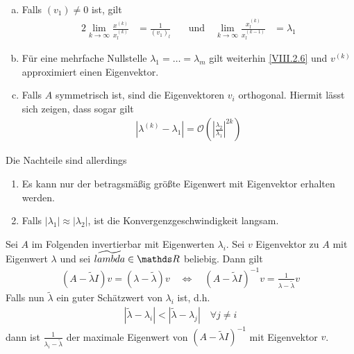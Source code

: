 \begin{Beme}~
  \begin{enumerate}[a)]
  \item Falls $(v_1)\neq 0$ ist, gilt
    \begin{alignat}{2}
      \lim_{k\to\infty} \frac{x^{(k)}}{x_l^{(k)}}
      &= \frac{1}{(v_1)_l}\quad
      &\text{und}\quad\lim_{k\to\infty}\frac{x_l^{(k)}}{x_l^{(k-1)}}
      &=\lambda_1
      \label{VIII.2.6}
    \end{alignat}
  \item Für eine mehrfache Nullstelle $\lambda_1=\ldots=\lambda_m$
    gilt weiterhin \eqref{VIII.2.6} und
    $v^{(k)}$ approximiert einen Eigenvektor.
  \item Falls $A$ symmetrisch ist,
    sind die Eigenvektoren $v_i$ orthogonal.
    Hiermit lässt sich zeigen, dass sogar gilt
    \begin{gather*}
      \left|\lambda^{(k)}-\lambda_1\right|
      = \mathcal{O}\left(\left|
        \frac{\lambda_2}{\lambda_1}
        \right|^{2k}\right)
    \end{gather*}
  \end{enumerate}
Die Nachteile sind allerdings
\begin{enumerate}[1)]
\item Es kann nur der betragsmäßig größte Eigenwert
  mit Eigenvektor erhalten werden.
\item Falls $|\lambda_1|\approx|\lambda_2|$,
  ist die Konvergenzgeschwindigkeit langsam.
\end{enumerate}
\end{Beme}


Sei $A$ im Folgenden invertierbar mit Eigenwerten $\lambda_i$.
Sei $v$ Eigenvektor zu $A$ mit Eigenwert $\lambda$ und
sei $\widetilde{lambda}\in\R$ beliebig. Dann gilt
\begin{gather*}
  (A-\widetilde{\lambda}I) v= (\lambda-\widetilde{\lambda})v
  \quad\Leftrightarrow\quad
  (A-\widetilde{\lambda}I)^{-1}v=
  \frac{1}{\lambda-\widetilde{\lambda}}v
\end{gather*}
Falls nun $\widetilde{\lambda}$ ein guter Schätzwert
von $\lambda_i$ ist, d.h.
\begin{gather*}
  |\widetilde{\lambda}-\lambda_i|<|\widetilde{\lambda}-\lambda_j|
  \quad \forall j\neq i
\end{gather*}
dann ist $\frac{1}{\lambda_i-\widetilde{\lambda}}$ 
der maximale Eigenwert von $(A-\widetilde{\lambda}I)^{-1}$
mit Eigenvektor $v$.

